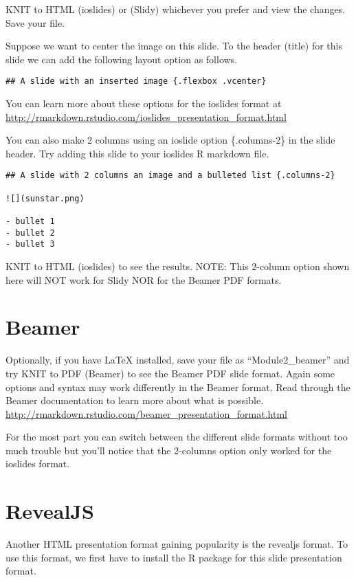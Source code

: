\documentclass[]{book}
\theoremstyle{definition}
\theoremstyle{definition}
\theoremstyle{definition}
\theoremstyle{remark}
\begin{document}
KNIT to HTML (ioslides) or (Slidy) whichever you prefer and view the
changes. Save your file.

Suppose we want to center the image on this slide. To the header (title)
for this slide we can add the following layout option as follows.

\texttt{\#\#\ A\ slide\ with\ an\ inserted\ image\ \{.flexbox\ .vcenter\}}

You can learn more about these options for the ioslides format at
\url{http://rmarkdown.rstudio.com/ioslides_presentation_format.html}

You can also make 2 columns using an ioslide option \{.columns-2\} in
the slide header. Try adding this slide to your ioslides R markdown
file.

\begin{verbatim}
## A slide with 2 columns an image and a bulleted list {.columns-2}

![](sunstar.png)

- bullet 1
- bullet 2
- bullet 3
\end{verbatim}

KNIT to HTML (ioslides) to see the results. NOTE: This 2-column option
shown here will NOT work for Slidy NOR for the Beamer PDF formats.

\section{Beamer}\label{beamer}

Optionally, if you have LaTeX installed, save your file as
``Module2\_beamer'' and try KNIT to PDF (Beamer) to see the Beamer PDF
slide format. Again some options and syntax may work differently in the
Beamer format. Read through the Beamer documentation to learn more about
what is possible.
\url{http://rmarkdown.rstudio.com/beamer_presentation_format.html}

For the most part you can switch between the different slide formats
without too much trouble but you'll notice that the 2-columns option
only worked for the ioslides format.

\section{RevealJS}\label{revealjs}

Another HTML presentation format gaining popularity is the revealjs
format. To use this format, we first have to install the R package for
this slide presentation format.
\end{document}
